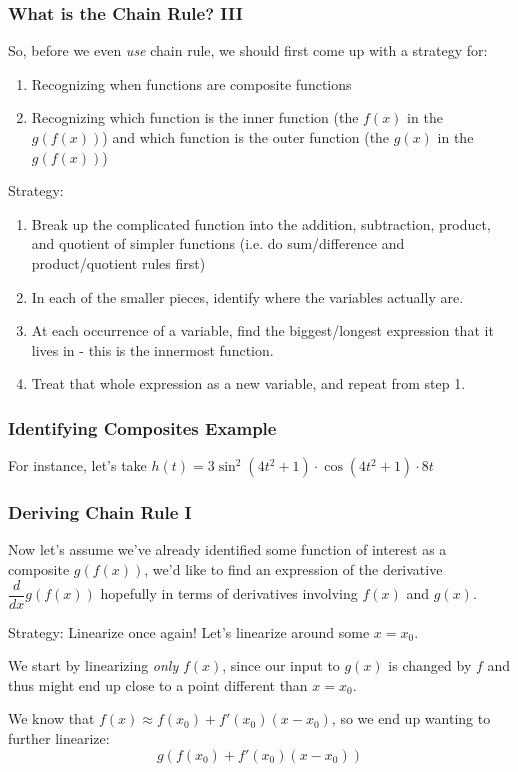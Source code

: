 \documentclass{ltx-talk}
\begin{document}
\begin{frame}
  \frametitle{What is the Chain Rule? III}

  So, before we even \textit{use} chain rule, we should first come up with a strategy for: \pause
  \begin{enumerate}
    \item Recognizing when functions are composite functions \pause
    \item Recognizing which function is the inner function (the $f(x)$ in the $g(f(x))$) and which function is the outer function (the $g(x)$ in the $g(f(x))$) \pause
  \end{enumerate}

  Strategy: \pause
  \begin{enumerate}
    \item Break up the complicated function into the addition, subtraction, product, and quotient of simpler functions (i.e. do sum/difference and product/quotient rules first) \pause
    \item In each of the smaller pieces, identify where the variables actually are. \pause
    \item At each occurrence of a variable, find the biggest/longest expression that it lives in - this is the innermost function. \pause
    \item Treat that whole expression as a new variable, and repeat from step 1.
  \end{enumerate}
\end{frame}

\begin{frame}
  \frametitle{Identifying Composites Example}

  For instance, let's take $h(t) = 3 \sin^2(4t^2 + 1) \cdot \cos (4t^2 + 1) \cdot 8t$
\end{frame}

\begin{frame}
  \frametitle{Deriving Chain Rule I}

  Now let's assume we've already identified some function of interest as a composite $g(f(x))$, \pause
  we'd like to find an expression of the derivative $\dfrac{d}{dx} g(f(x))$ hopefully in terms of derivatives involving $f(x)$ and $g(x)$. \pause

  Strategy: Linearize once again! \pause Let's linearize around some $x = x_0$. \pause

  We start by linearizing \textit{only} $f(x)$, \pause since our input to $g(x)$ is changed by $f$ and thus might end up close to a point different than $x = x_0$. \pause

  We know that $f(x) \approx f(x_0) + f'(x_0)(x - x_0)$, \pause so we end up wanting to further linearize:
  \begin{equation*}
    g(f(x_0) + f'(x_0)(x - x_0))
  \end{equation*}
\end{frame}
\end{document}
